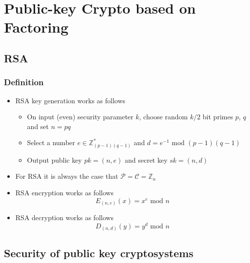 \section{Public-key Crypto based on Factoring}

\subsection{RSA}
\subsubsection{Definition}
\begin{itemize}
  \item RSA key generation works as follows
  \begin{itemize}
  	\item On input (even) security parameter $k$, choose random $k/2$ bit primes $p$, $q$ and set $n = pq$
  	\item Select a number $e \in \mathbb Z^*_{(p-1)(q-1)}$ and $d = e^{-1} \text{ mod } (p-1)(q-1)$
  	\item Output public key $pk = (n,e)$ and secret key $sk = (n,d)$
  \end{itemize}
  \item For RSA it is always the case that $\mathcal P = \mathcal C = \mathbb Z_n$
  \item RSA encryption works as follows
  \[
    E_{(n,e)}(x) = x^e \text{ mod } n 
  \]
  \item RSA decryption works as follows
  \[
    D_{(n,d)}(y) = y^d \text{ mod } n
  \]
\end{itemize}


\subsection{Security of public key cryptosystems}
